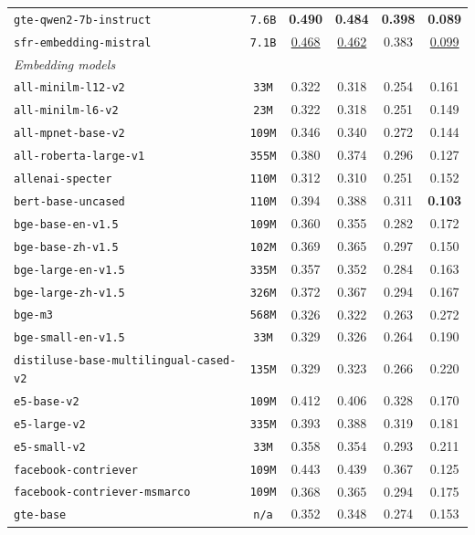 \documentclass[11pt]{article}
\begin{document}
\begin{table}[h!]
{\begin{tabular}{lccccc}
\texttt{gte-qwen2-7b-instruct} & \texttt{7.6B} & \textbf{0.490} & \textbf{0.484} & \textbf{0.398} & \textbf{0.089} \\
\texttt{sfr-embedding-mistral} & \texttt{7.1B} & \underline{0.468} & \underline{0.462} & 0.383 & \underline{0.099} \\
\midrule
\multicolumn{6}{l}{\textit{Embedding models}} \\
\midrule
\texttt{all-minilm-l12-v2} & \texttt{33M} & 0.322 & 0.318 & 0.254 & 0.161 \\
\texttt{all-minilm-l6-v2} & \texttt{23M} & 0.322 & 0.318 & 0.251 & 0.149 \\
\texttt{all-mpnet-base-v2} & \texttt{109M} & 0.346 & 0.340 & 0.272 & 0.144 \\
\texttt{all-roberta-large-v1} & \texttt{355M} & 0.380 & 0.374 & 0.296 & 0.127 \\
\texttt{allenai-specter} & \texttt{110M} & 0.312 & 0.310 & 0.251 & 0.152 \\
\texttt{bert-base-uncased} & \texttt{110M} & 0.394 & 0.388 & 0.311 & \textbf{0.103} \\
\texttt{bge-base-en-v1.5} & \texttt{109M} & 0.360 & 0.355 & 0.282 & 0.172 \\
\texttt{bge-base-zh-v1.5} & \texttt{102M} & 0.369 & 0.365 & 0.297 & 0.150 \\
\texttt{bge-large-en-v1.5} & \texttt{335M} & 0.357 & 0.352 & 0.284 & 0.163 \\
\texttt{bge-large-zh-v1.5} & \texttt{326M} & 0.372 & 0.367 & 0.294 & 0.167 \\
\texttt{bge-m3} & \texttt{568M} & 0.326 & 0.322 & 0.263 & 0.272 \\
\texttt{bge-small-en-v1.5} & \texttt{33M} & 0.329 & 0.326 & 0.264 & 0.190 \\
\texttt{distiluse-base-multilingual-cased-v2} & \texttt{135M} & 0.329 & 0.323 & 0.266 & 0.220 \\
\texttt{e5-base-v2} & \texttt{109M} & 0.412 & 0.406 & 0.328 & 0.170 \\
\texttt{e5-large-v2} & \texttt{335M} & 0.393 & 0.388 & 0.319 & 0.181 \\
\texttt{e5-small-v2} & \texttt{33M} & 0.358 & 0.354 & 0.293 & 0.211 \\
\texttt{facebook-contriever} & \texttt{109M} & 0.443 & 0.439 & 0.367 & 0.125 \\
\texttt{facebook-contriever-msmarco} & \texttt{109M} & 0.368 & 0.365 & 0.294 & 0.175 \\
\texttt{gte-base} & \texttt{n/a} & 0.352 & 0.348 & 0.274 & 0.153 \\

\end{tabular}}
\end{table}
\end{document}

